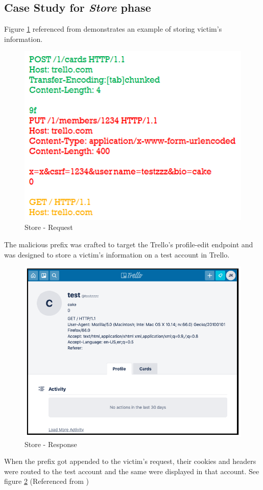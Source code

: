 \subsection{Case Study for \textit{Store} phase}
Figure \ref{fig:Store_Request} referenced from \cite{b6} demonstrates an example of storing victim's information.
\begin{figure}
	\includegraphics{images/Store_Request}
	\caption{Store - Request}
	\label{fig:Store_Request}
\end{figure}
The malicious prefix was crafted to target the Trello's profile-edit endpoint and was designed to store a victim's information on a test account in Trello.\\
\begin{figure}
	\includegraphics[width=14cm]{images/Store_Response}
	\caption{Store - Response}
	\label{fig:Store_Response}
\end{figure}
When the prefix got appended to the victim's request, their cookies and headers were routed to the test account and the same were displayed in that account. See figure \ref{fig:Store_Response} (Referenced from \cite{b6})\\

